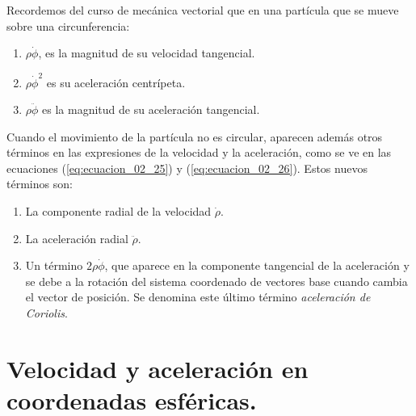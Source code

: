 Recordemos del curso de mecánica vectorial que en una partícula que se mueve sobre una circunferencia:
\begin{enumerate}[label=\alph*)]
\item $\rho \dot{\phi}$, es la magnitud de su velocidad tangencial.
\item $\rho \dot{\phi}^{2}$ es su aceleración centrípeta.
\item $\rho \ddot{\phi}$ es la magnitud de su aceleración tangencial.
\end{enumerate}
Cuando el movimiento de la partícula no es circular, aparecen además otros términos en las expresiones de la velocidad y la aceleración, como se ve en las ecuaciones (\ref{eq:ecuacion_02_25}) y (\ref{eq:ecuacion_02_26}). Estos nuevos términos son:
\begin{enumerate}[label=\roman*)]
\item La componente radial de la velocidad $\dot{\rho}$.
\item La aceleración radial $\ddot{\rho}$.
\item Un término $2 \rho \dot{\phi}$, que aparece en la componente tangencial de la aceleración y se debe a la rotación del sistema coordenado de vectores base cuando cambia el vector de posición. Se denomina este último término \emph{aceleración de Coriolis}.
\end{enumerate}

\section{Velocidad y aceleración en coordenadas esféricas.}

